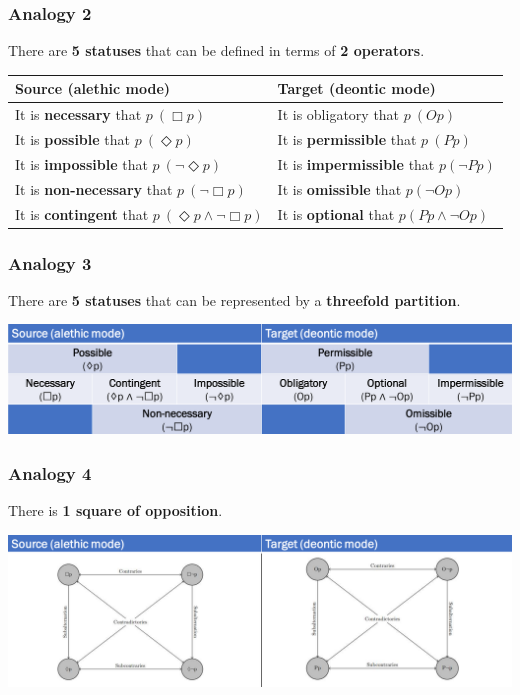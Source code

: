 \documentclass[11pt]{article}
\begin{document}
\subsubsection{Analogy 2}
\label{sec:org962101b}
There are \textbf{5 statuses} that can be defined in terms of \textbf{2 operators}.
\begin{center}
\begin{tabularx}{\textwidth}{X|X}
Source (alethic mode) & Target (deontic mode)\\
\hline
It is \textbf{necessary} that \(p \ (\Box p)\) & It is obligatory that \(p \ (Op)\)\\
It is \textbf{possible} that \(p \ (\Diamond p)\) & It is \textbf{permissible} that \(p \ (Pp)\)\\
It is \textbf{impossible} that \(p \ (\neg \Diamond p)\) & It is \textbf{impermissible} that \(p (\neg Pp)\)\\
It is \textbf{non-necessary} that \(p \ (\neg \Box p)\) & It is \textbf{omissible} that \(p (\neg Op)\)\\
It is \textbf{contingent} that \(p \ (\Diamond p \wedge \neg \Box p)\) & It is \textbf{optional} that \(p (Pp \wedge \neg Op)\)\\
\end{tabularx}
\end{center}
\subsubsection{Analogy 3}
\label{sec:orgf22ed37}
There are \textbf{5 statuses} that can be represented by a \textbf{threefold partition}.
\begin{center}
\includegraphics[width=.9\linewidth]{./images/threefold-partition-analogy.png}
\end{center}
\subsubsection{Analogy 4}
\label{sec:org9b9ed6a}
There is \textbf{1 square of opposition}.
\begin{center}
\includegraphics[width=.9\linewidth]{./images/one-square-of-opposition-analogy.png}
\end{center}
\end{document}
